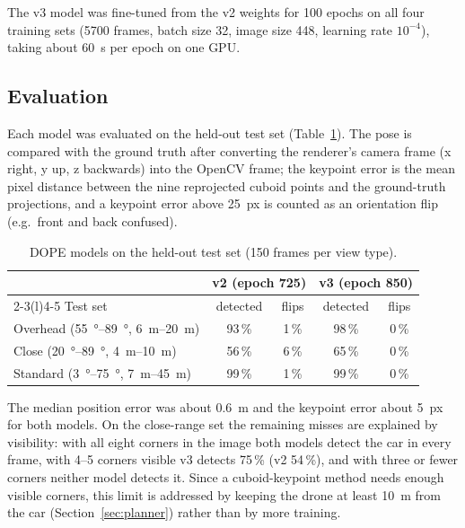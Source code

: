 \documentclass[11pt,a4paper]{report}
\begin{document}
The v3 model was fine-tuned from the v2 weights for 100 epochs on all four
training sets (5700 frames, batch size 32, image size 448, learning rate
$10^{-4}$), taking about \SI{60}{s} per epoch on one GPU.

\subsection{Evaluation}
Each model was evaluated on the held-out test set (Table~\ref{tab:dope-eval}). The pose is compared with
the ground truth after converting the renderer's camera frame (x right, y up,
z backwards) into the OpenCV frame; the keypoint error is the mean pixel
distance between the nine reprojected cuboid points and the ground-truth
projections, and a keypoint error above \SI{25}{px} is counted as an
orientation flip (e.g.\ front and back confused).

\begin{table}[htbp]
  \centering
  \caption{DOPE models on the held-out test set (150 frames per view type).}
  \label{tab:dope-eval}
  \begin{tabular}{@{}lcccc@{}}
    \toprule
     & \multicolumn{2}{c}{v2 (epoch 725)} & \multicolumn{2}{c}{v3 (epoch 850)} \\
    \cmidrule(lr){2-3}\cmidrule(l){4-5}
    Test set & detected & flips & detected & flips \\
    \midrule
    Overhead (\SIrange{55}{89}{\degree}, \SIrange{6}{20}{m}) & 93\,\% & 1\,\% & 98\,\% & 0\,\% \\
    Close (\SIrange{20}{89}{\degree}, \SIrange{4}{10}{m}) & 56\,\% & 6\,\% & 65\,\% & 0\,\% \\
    Standard (\SIrange{3}{75}{\degree}, \SIrange{7}{45}{m}) & 99\,\% & 1\,\% & 99\,\% & 0\,\% \\
    \bottomrule
  \end{tabular}
\end{table}

The median position error was about \SI{0.6}{m} and the keypoint error about
\SI{5}{px} for both models. On the close-range set the remaining misses are
explained by visibility: with all eight corners in the image both models detect
the car in every frame, with 4--5 corners visible v3 detects 75\,\% (v2 54\,\%),
and with three or fewer corners neither model detects it. Since a
cuboid-keypoint method needs enough visible corners, this limit is addressed by
keeping the drone at least \SI{10}{m} from the car
(Section~\ref{sec:planner}) rather than by more training.
\end{document}
